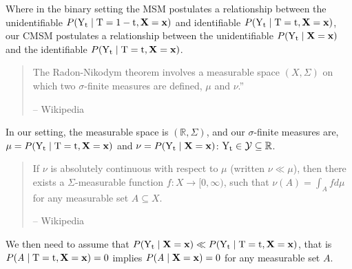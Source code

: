 Where in the binary setting the MSM postulates a relationship between the unidentifiable $P(\mathrm{Y}_{\mathrm{t}} \mid \mathrm{T}=1-\mathrm{t}, \mathbf{X}=\mathbf{x})$ and identifiable $P(\mathrm{Y}_{\mathrm{t}} \mid \mathrm{T}=\mathrm{t}, \mathbf{X}=\mathbf{x})$, our CMSM postulates a relationship between the unidentifiable $P(\mathrm{Y}_{\mathrm{t}} \mid \mathbf{X}=\mathbf{x})$ and the identifiable $P(\mathrm{Y}_{\mathrm{t}} \mid \mathrm{T}=\mathrm{t}, \mathbf{X}=\mathbf{x})$. 
\begin{quote}
    The Radon-Nikodym theorem involves a measurable space $(\mathit{X}, \Sigma)$ on which two $\sigma$-finite measures are defined, $\mu$ and $\nu$.'' 
    
    -- Wikipedia
\end{quote}
In our setting, the measurable space is $(\mathbb{R}, \Sigma)$, and our $\sigma$-finite measures are, $\mu=P(\mathrm{Y}_{\mathrm{t}} \mid \mathrm{T}=\mathrm{t}, \mathbf{X}=\mathbf{x})$ and $\nu=P(\mathrm{Y}_{\mathrm{t}} \mid \mathbf{X}=\mathbf{x})$: $\mathrm{Y}_{\mathrm{t}} \in \mathcal{Y} \subseteq \mathbb{R}$.
\begin{quote}
    If $\nu$ is absolutely continuous with respect to $\mu$ (written $\nu \ll \mu$), then there exists a $\Sigma$-measurable function $f: \mathit{X} \to [0, \infty)$, such that $\nu(\mathit{A}) = \int_{\mathit{A}} f d\mu$ for any measurable set $\mathit{A} \subseteq \textit{X}$. 
    
    -- Wikipedia
\end{quote}
We then need to assume that $P(\mathrm{Y}_{\mathrm{t}} \mid \mathbf{X}=\mathbf{x}) \ll P(\mathrm{Y}_{\mathrm{t}} \mid \mathrm{T}=\mathrm{t}, \mathbf{X}=\mathbf{x})$, that is $P(\mathit{A} \mid \mathrm{T}=\mathrm{t}, \mathbf{X}=\mathbf{x}) = 0$ implies $P(\mathit{A} \mid \mathbf{X}=\mathbf{x}) = 0$ for any measurable set $\mathit{A}$. 

